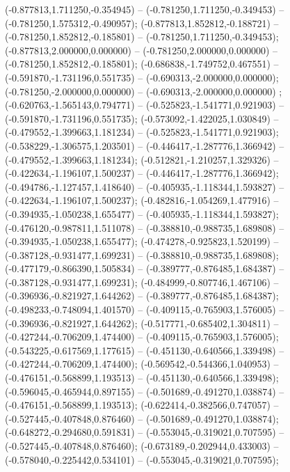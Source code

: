  (-0.877813,1.711250,-0.354945) -- (-0.781250,1.711250,-0.349453) -- (-0.781250,1.575312,-0.490957);
 (-0.877813,1.852812,-0.188721) -- (-0.781250,1.852812,-0.185801) -- (-0.781250,1.711250,-0.349453);
 (-0.877813,2.000000,0.000000) -- (-0.781250,2.000000,0.000000) -- (-0.781250,1.852812,-0.185801);
 (-0.686838,-1.749752,0.467551) -- (-0.591870,-1.731196,0.551735) -- (-0.690313,-2.000000,0.000000);
 (-0.781250,-2.000000,0.000000) -- (-0.690313,-2.000000,0.000000) ;
 (-0.620763,-1.565143,0.794771) -- (-0.525823,-1.541771,0.921903) -- (-0.591870,-1.731196,0.551735);
 (-0.573092,-1.422025,1.030849) -- (-0.479552,-1.399663,1.181234) -- (-0.525823,-1.541771,0.921903);
 (-0.538229,-1.306575,1.203501) -- (-0.446417,-1.287776,1.366942) -- (-0.479552,-1.399663,1.181234);
 (-0.512821,-1.210257,1.329326) -- (-0.422634,-1.196107,1.500237) -- (-0.446417,-1.287776,1.366942);
 (-0.494786,-1.127457,1.418640) -- (-0.405935,-1.118344,1.593827) -- (-0.422634,-1.196107,1.500237);
 (-0.482816,-1.054269,1.477916) -- (-0.394935,-1.050238,1.655477) -- (-0.405935,-1.118344,1.593827);
 (-0.476120,-0.987811,1.511078) -- (-0.388810,-0.988735,1.689808) -- (-0.394935,-1.050238,1.655477);
 (-0.474278,-0.925823,1.520199) -- (-0.387128,-0.931477,1.699231) -- (-0.388810,-0.988735,1.689808);
 (-0.477179,-0.866390,1.505834) -- (-0.389777,-0.876485,1.684387) -- (-0.387128,-0.931477,1.699231);
 (-0.484999,-0.807746,1.467106) -- (-0.396936,-0.821927,1.644262) -- (-0.389777,-0.876485,1.684387);
 (-0.498233,-0.748094,1.401570) -- (-0.409115,-0.765903,1.576005) -- (-0.396936,-0.821927,1.644262);
 (-0.517771,-0.685402,1.304811) -- (-0.427244,-0.706209,1.474400) -- (-0.409115,-0.765903,1.576005);
 (-0.543225,-0.617569,1.177615) -- (-0.451130,-0.640566,1.339498) -- (-0.427244,-0.706209,1.474400);
 (-0.569542,-0.544366,1.040953) -- (-0.476151,-0.568899,1.193513) -- (-0.451130,-0.640566,1.339498);
 (-0.596045,-0.465944,0.897155) -- (-0.501689,-0.491270,1.038874) -- (-0.476151,-0.568899,1.193513);
 (-0.622414,-0.382566,0.747057) -- (-0.527445,-0.407848,0.876460) -- (-0.501689,-0.491270,1.038874);
 (-0.648272,-0.294680,0.591831) -- (-0.553045,-0.319021,0.707595) -- (-0.527445,-0.407848,0.876460);
 (-0.673189,-0.202944,0.433003) -- (-0.578040,-0.225442,0.534101) -- (-0.553045,-0.319021,0.707595);
